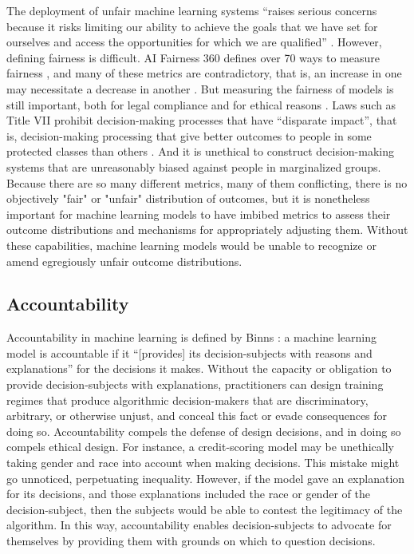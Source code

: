 \documentclass[sigconf]{acmart}
\begin{document}
The deployment of unfair machine learning systems ``raises serious concerns because it risks limiting our ability to achieve the goals that we have set for ourselves and access the opportunities for which we are qualified'' \citep{Barocas2019}. However, defining fairness is difficult. AI Fairness 360 defines over 70 ways to measure fairness \citep{Bellamy2018}, and many of these metrics are contradictory, that is, an increase in one may necessitate a decrease in another \citep{Kleinberg2016}. But measuring the fairness of models is still important, both for legal compliance \citep{Barocas2016} and for ethical reasons \citep{Binns2018}. Laws such as Title VII prohibit decision-making processes that have ``disparate impact'', that is, decision-making processing that give better outcomes to people in some protected classes than others \citep{Barocas2016}. And it is unethical to construct decision-making systems that are unreasonably biased against people in marginalized groups. Because there are so many different metrics, many of them conflicting, there is no objectively "fair" or "unfair" distribution of outcomes, but it is nonetheless important for machine learning models to have imbibed metrics to assess their outcome distributions and mechanisms for appropriately adjusting them. Without these capabilities, machine learning models would be unable to recognize or amend egregiously unfair outcome distributions.

\subsection{Accountability}
Accountability in machine learning is defined by Binns : a machine learning model is accountable if it ``[provides] its decision-subjects with reasons and explanations'' for the decisions it makes. Without the capacity or obligation to provide decision-subjects with explanations, practitioners can design training regimes that produce algorithmic decision-makers that are discriminatory, arbitrary, or otherwise unjust, and conceal this fact or evade consequences for doing so. Accountability compels the defense of design decisions, and in doing so compels ethical design. For instance, a credit-scoring model may be unethically taking gender and race into account when making decisions. This mistake might go unnoticed, perpetuating inequality. However, if the model gave an explanation for its decisions, and those explanations included the race or gender of the decision-subject, then the subjects would be able to contest the legitimacy of the algorithm. In this way, accountability enables decision-subjects to advocate for themselves by providing them with grounds on which to question decisions.
\end{document}
